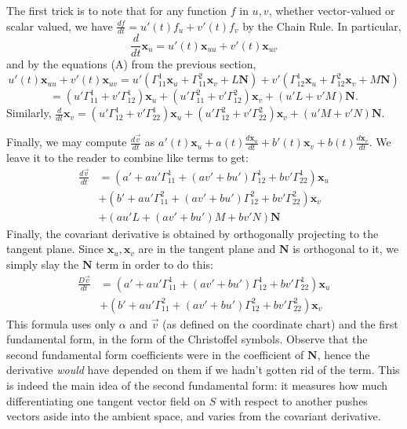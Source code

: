 \documentclass[leqno]{book}
\begin{document}
The first trick is to note that for any function $f$ in $u,v$, whether vector-valued or scalar valued, we have $\frac{df}{dt}=u'(t)f_u+v'(t)f_v$ by the Chain Rule.  In particular,
$$\frac d{dt}\mathbf x_u=u'(t)\mathbf x_{uu}+v'(t)\mathbf x_{uv}$$
and by the equations (A) from the previous section,
$$u'(t)\mathbf x_{uu}+v'(t)\mathbf x_{uv}=u'\left(\Gamma_{11}^1\mathbf x_u+\Gamma_{11}^2\mathbf x_v+L\mathbf N\right)+v'\left(\Gamma_{12}^1\mathbf x_u+\Gamma_{12}^2\mathbf x_v+M\mathbf N\right)$$
$$=(u'\Gamma_{11}^1+v'\Gamma_{12}^1)\mathbf x_u+(u'\Gamma_{11}^2+v'\Gamma_{12}^2)\mathbf x_v+(u'L+v'M)\mathbf N.$$
Similarly, $\frac d{dt}\mathbf x_v=(u'\Gamma_{12}^1+v'\Gamma_{22}^1)\mathbf x_u+(u'\Gamma_{12}^2+v'\Gamma_{22}^2)\mathbf x_v+(u'M+v'N)\mathbf N$.

Finally, we may compute $\frac{d\vec v}{dt}$ as $a'(t)\mathbf x_u+a(t)\frac{d\mathbf x_u}{dt}+b'(t)\mathbf x_v+b(t)\frac{d\mathbf x_v}{dt}$.  We leave it to the reader to combine like terms to get:
\begin{align*}
\frac{d\vec v}{dt}
&=\left(a'+au'\Gamma_{11}^1+(av'+bu')\Gamma_{12}^1+bv'\Gamma_{22}^1\right)\mathbf x_u\\
&+\left(b'+au'\Gamma_{11}^2+(av'+bu')\Gamma_{12}^2+bv'\Gamma_{22}^2\right)\mathbf x_v\\
&+\left(au'L+(av'+bu')M+bv'N\right)\mathbf N
\end{align*}
Finally, the covariant derivative is obtained by orthogonally projecting to the tangent plane.  Since $\mathbf x_u,\mathbf x_v$ are in the tangent plane and $\mathbf N$ is orthogonal to it, we simply slay the $\mathbf N$ term in order to do this:
\begin{align*}
\frac{D\vec v}{dt}
&=\left(a'+au'\Gamma_{11}^1+(av'+bu')\Gamma_{12}^1+bv'\Gamma_{22}^1\right)\mathbf x_u\\
&+\left(b'+au'\Gamma_{11}^2+(av'+bu')\Gamma_{12}^2+bv'\Gamma_{22}^2\right)\mathbf x_v
\end{align*}
This formula uses only $\alpha$ and $\vec v$ (as defined on the coordinate chart) and the first fundamental form, in the form of the Christoffel symbols.  Observe that the second fundamental form coefficients were in the coefficient of $\mathbf N$, hence the derivative \emph{would} have depended on them if we hadn't gotten rid of the term.  This is indeed the main idea of the second fundamental form: it measures how much differentiating one tangent vector field on $S$ with respect to another pushes vectors aside into the ambient space, and varies from the covariant derivative.
\end{document}
